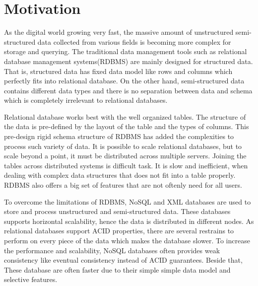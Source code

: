 
\section{Motivation}
		\label{motivation}
		    As the digital world growing very fast, the massive amount of unstructured semi-structured data collected from various fields is becoming more complex for storage and querying. The traditional data management tools such as relational database management systems(RDBMS) are mainly designed for structured data. That is, structured data has fixed data model like rows and columns which perfectly fits into relational database. On the other hand, semi-structured data contains different data types and there is no separation between data and schema which is completely irrelevant to relational databases. 
\par		
Relational database works best with the well organized tables. The structure of the data is pre-defined by the layout of the table and the types of columns. This pre-design rigid schema structure of RDBMS has added the complexities to process such variety of data. It is possible to scale relational databases, but to scale beyond a point, it must be distributed across multiple servers. Joining the tables across distributed systems is difficult task. It is slow and inefficient, when dealing with complex data structures that does not fit into a table properly. RDBMS also offers a big set of features that are not oftenly need for all users.
	\par
To overcome the limitations of RDBMS, NoSQL and XML databases are used to store and process unstructured and semi-structured data. These databases supports horizontal scalability, hence the data is distributed in different nodes. As relational databases support ACID properties, there are several restrains to perform on every piece of the data which makes the database slower. To increase the performance and scalability, NoSQL databases often provides weak consistency like eventual consistency instead of ACID guarantees. Beside that,  These database are often faster due to their simple simple data model and selective features.
